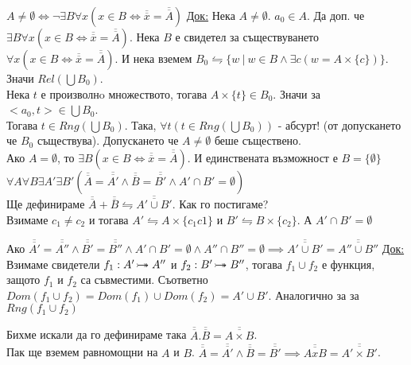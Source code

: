 \documentclass[fleqn, titlepage, 12pt]{report}
\newcommand*\rightbijectionarrow{\mathrel{\ooalign{$\twoheadrightarrow$\cr\hidewidth\hbox{$\rightarrowtail\mkern 1mu$}\cr}}}
\begin{document}
 $A \neq \emptyset \Longleftrightarrow \lnot \exists{B}\forall{x}(x \in B \Leftrightarrow \overline{\overline{x}} = \overline{\overline{A}})$
\bigbreak
\underline{Док:} Нека $A \neq \emptyset$. $a_0 \in A$. Да доп. че $\exists{B}\forall{x}(x \in B \Leftrightarrow \overline{\overline{x}} = \overline{\overline{A}})$.
Нека $B$ е свидетел за съществуването $\forall{x}(x \in B \Leftrightarrow \overline{\overline{x}} = \overline{\overline{A}})$. И нека вземем $B_0 \leftrightharpoons \{w\ |\ w \in B \land \exists{c}(w = A \times \{ c \})\}$.
Значи $Rel(\bigcup B_0)$.\\
Нека $t$ е произволнo множеството, тогава $A \times \{ t \} \in B_0$. Значи за $<a_0,t> \in \bigcup B_0$.\\
Тогава $t \in Rng(\bigcup B_0)$. Така, $\forall{t}(t \in Rng(\bigcup B_0))$ - абсурт! (от допускането че $B_0$ съществува).
\bigbreak
Допускането че $A \neq \emptyset$ беше съществено.\\
Ако $A = \emptyset$, то $\exists{B}(x \in B \Leftrightarrow \overline{\overline{x}} = \overline{\overline{A}})$.
И единствената възможност е $B = \{ \emptyset \}$
\bigbreak
{} $\forall{A}\forall{B}\exists{A'}\exists{B'}(\overline{\overline{A}} = \overline{\overline{A'}} \land \overline{\overline{B}} = \overline{\overline{B'}} \land A' \cap B' = \emptyset )$\\
Ще дефинираме $\overline{\overline{A}} + \overline{\overline{B}} \leftrightharpoons \overline{\overline{A' \cup B'}}$.
Как го постигаме?\\
Взимаме $c_1 \neq c_2$ и тогава $A' \leftrightharpoons A \times \{ c_1c1 \}$ и
$B' \leftrightharpoons B \times \{ c_2 \}$. А $A' \cap B' = \emptyset$
\bigbreak

 Ако $\overline{\overline{A'}} = \overline{\overline{A''}} \land \overline{\overline{B'}} = \overline{\overline{B''}} \land  A' \cap B' = \emptyset \land  A'' \cap B'' = \emptyset \implies \overline{\overline{A' \cup B'}} = \overline{\overline{A'' \cup B''}}$
\bigbreak
\underline{Док:} Взимаме свидетели $f_1: A' \rightbijectionarrow A''$ и $ f_2: B' \rightbijectionarrow B''$, тогава
$f_1 \cup f_2$ е функция, защото $f_1$ и $f_2$ са съвместими.
Съответно $Dom(f_1 \cup f_2) = Dom(f_1) \cup Dom(f_2) = A' \cup B'$. Аналогично за за $Rng(f_1 \cup f_2)$

 Бихме искали да го дефинираме така
$\overline{\overline{A}}.\overline{\overline{B}} = \overline{\overline{A \times B}}$.\\
Пак ще вземем равномощни на $A$ и $B$.
$\overline{\overline{A}} = \overline{\overline{A'}} \land  \overline{\overline{B}} = \overline{\overline{B'}} \implies
\overline{\overline{A x B}} = \overline{\overline{A' \times  B'}}$.
\bigbreak
\end{document}
